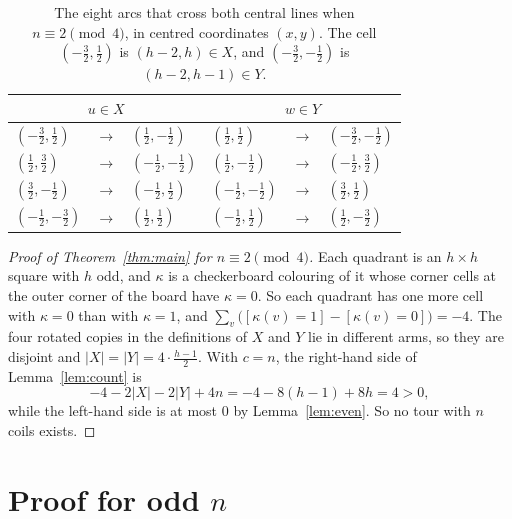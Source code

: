 \documentclass[11pt]{amsart}
\theoremstyle{remark}
\begin{document}
\begin{table}[h]
\caption{The eight arcs that cross both central lines when $n\equiv2\pmod 4$, in centred coordinates $(x,y)$.
The cell $(-\frac32,\frac12)$ is $(h-2,h)\in X$, and $(-\frac32,-\frac12)$ is $(h-2,h-1)\in Y$.}
\label{tab:central}
\begin{tabular}{lcl@{\qquad}lcl}
\toprule
\multicolumn{3}{c}{$u\in X$} & \multicolumn{3}{c}{$w\in Y$}\\
\midrule
$(-\frac32,\frac12)$&$\to$&$(\frac12,-\frac12)$ & $(\frac12,\frac12)$&$\to$&$(-\frac32,-\frac12)$\\
$(\frac12,\frac32)$&$\to$&$(-\frac12,-\frac12)$ & $(\frac12,-\frac12)$&$\to$&$(-\frac12,\frac32)$\\
$(\frac32,-\frac12)$&$\to$&$(-\frac12,\frac12)$ & $(-\frac12,-\frac12)$&$\to$&$(\frac32,\frac12)$\\
$(-\frac12,-\frac32)$&$\to$&$(\frac12,\frac12)$ & $(-\frac12,\frac12)$&$\to$&$(\frac12,-\frac32)$\\
\bottomrule
\end{tabular}
\end{table}

\begin{proof}[Proof of Theorem~\ref{thm:main} for $n\equiv 2\pmod 4$]
Each quadrant is an $h\times h$ square with $h$ odd, and $\kappa$ is a checkerboard colouring of it whose corner
cells at the outer corner of the board have $\kappa=0$. So each quadrant has one more cell with $\kappa=0$ than with
$\kappa=1$, and $\sum_v\bigl([\kappa(v)=1]-[\kappa(v)=0]\bigr)=-4$. The four rotated copies in the definitions of
$X$ and $Y$ lie in different arms, so they are disjoint and $|X|=|Y|=4\cdot\frac{h-1}2$. With $c=n$,
the right-hand side of Lemma~\ref{lem:count} is
\[ -4-2|X|-2|Y|+4n=-4-8(h-1)+8h=4>0, \]
while the left-hand side is at most $0$ by Lemma~\ref{lem:even}. So no tour with $n$ coils exists.
\end{proof}

\section{Proof for odd \texorpdfstring{$n$}{n}}
\end{document}
